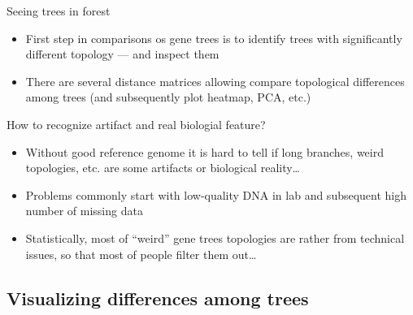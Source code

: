 \documentclass[compress, ucs, xelatex, 11pt, xcolor=x11names, aspectratio=1609,
	hyperref={
		bookmarks=true,
		unicode=true,
		colorlinks=true,
		pdftitle={HybSeq course},
		plainpages=false,
		pdfauthor={Vojtech Zeisek},
		pdfsubject={Practical processing of HybSeq target enrichment sequencing data on computing grids like MetaCentrum},
		pdfcreator={XeLaTeX},
		pdfkeywords={BASH, command line, GNU, HybSeq, Linux, MetaCentrum, sequencing shell, target enrichment},
		linkcolor=Cyan2, %
		anchorcolor=Firebrick2, %
		citecolor=Firebrick2, %
		filecolor=Firebrick2, %
		menucolor=Firebrick2, %
		urlcolor=Chartreuse2, %
		pdftex},
	url={hyphens, lowtilde} %
	]{beamer}
\begin{document}
\begin{frame}{Seeing trees in forest}
	\begin{itemize}
		\item First step in comparisons os gene trees is to identify trees with significantly different topology --- and inspect them
		\item There are several distance matrices allowing compare topological differences among trees (and subsequently plot heatmap, PCA, etc.)
	\end{itemize}
	\begin{block}{How to recognize artifact and real biologial feature?}
		\begin{itemize}
			\item Without good reference genome it is hard to tell if long branches, weird topologies, etc. are some artifacts or biological reality\ldots
			\item Problems commonly start with low-quality DNA in lab and subsequent high number of missing data
			\item Statistically, most of \enquote{weird} gene trees topologies are rather from technical issues, so that most of people filter them out\ldots
		\end{itemize}
	\end{block}
\end{frame}

\subsection{Visualizing differences among trees}
\end{document}
